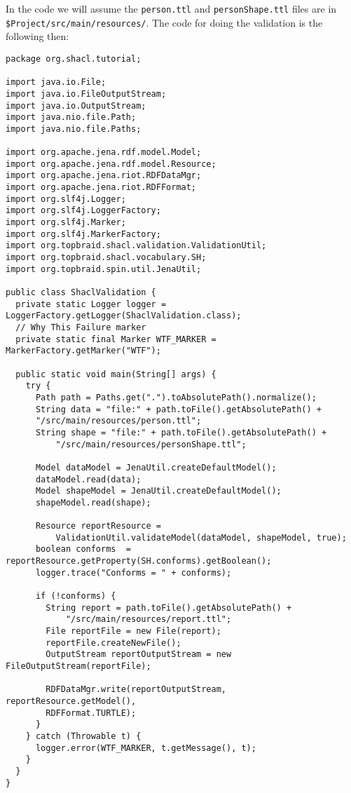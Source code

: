 \documentclass{amsart}
\begin{document}
  In the code we will assume the \texttt{person.ttl} and \texttt{personShape.ttl} files are in \\\texttt{\$Project/src/main/resources/}. The code for doing the validation is the following then:
  \begin{small}
  \begin{Verbatim}   
package org.shacl.tutorial;

import java.io.File;
import java.io.FileOutputStream;
import java.io.OutputStream;
import java.nio.file.Path;
import java.nio.file.Paths;

import org.apache.jena.rdf.model.Model;
import org.apache.jena.rdf.model.Resource;
import org.apache.jena.riot.RDFDataMgr;
import org.apache.jena.riot.RDFFormat;
import org.slf4j.Logger;
import org.slf4j.LoggerFactory;
import org.slf4j.Marker;
import org.slf4j.MarkerFactory;
import org.topbraid.shacl.validation.ValidationUtil;
import org.topbraid.shacl.vocabulary.SH;
import org.topbraid.spin.util.JenaUtil;

public class ShaclValidation {
  private static Logger logger = LoggerFactory.getLogger(ShaclValidation.class);
  // Why This Failure marker
  private static final Marker WTF_MARKER = MarkerFactory.getMarker("WTF");
	
  public static void main(String[] args) {
    try {		
      Path path = Paths.get(".").toAbsolutePath().normalize();
      String data = "file:" + path.toFile().getAbsolutePath() + 
	  "/src/main/resources/person.ttl";
      String shape = "file:" + path.toFile().getAbsolutePath() + 
          "/src/main/resources/personShape.ttl";
			
      Model dataModel = JenaUtil.createDefaultModel();
      dataModel.read(data);
      Model shapeModel = JenaUtil.createDefaultModel();
      shapeModel.read(shape);
      
      Resource reportResource = 
          ValidationUtil.validateModel(dataModel, shapeModel, true);
      boolean conforms  = reportResource.getProperty(SH.conforms).getBoolean();
      logger.trace("Conforms = " + conforms);
			
      if (!conforms) {
        String report = path.toFile().getAbsolutePath() + 
            "/src/main/resources/report.ttl";
        File reportFile = new File(report);
        reportFile.createNewFile();     
        OutputStream reportOutputStream = new FileOutputStream(reportFile);
      
        RDFDataMgr.write(reportOutputStream, reportResource.getModel(), 
	    RDFFormat.TURTLE);
      }	
    } catch (Throwable t) {
      logger.error(WTF_MARKER, t.getMessage(), t);
    }		
  }
}
  \end{Verbatim}
  \end{small}
  
\end{document}
